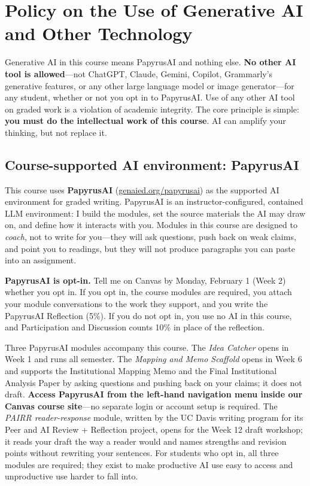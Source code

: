 \documentclass[12pt]{article}
\begin{document}
\section*{Policy on the Use of Generative AI and Other Technology}

Generative AI in this course means PapyrusAI and nothing else. \textbf{No other AI tool is allowed}---not ChatGPT, Claude, Gemini, Copilot, Grammarly's generative features, or any other large language model or image generator---for any student, whether or not you opt in to PapyrusAI. Use of any other AI tool on graded work is a violation of academic integrity. The core principle is simple: \textbf{you must do the intellectual work of this course}. AI can amplify your thinking, but not replace it.

\subsection*{Course-supported AI environment: PapyrusAI}

This course uses \textbf{PapyrusAI} (\href{https://www.genaied.org/papyrusai.html}{genaied.org/papyrusai}) as the supported AI environment for graded writing. PapyrusAI is an instructor-configured, contained LLM environment: I build the modules, set the source materials the AI may draw on, and define how it interacts with you. Modules in this course are designed to \emph{coach}, not to write for you---they will ask questions, push back on weak claims, and point you to readings, but they will not produce paragraphs you can paste into an assignment.

\textbf{PapyrusAI is opt-in.} Tell me on Canvas by Monday, February 1 (Week 2) whether you opt in. If you opt in, the course modules are required, you attach your module conversations to the work they support, and you write the PapyrusAI Reflection (5\%). If you do not opt in, you use no AI in this course, and Participation and Discussion counts 10\% in place of the reflection.

Three PapyrusAI modules accompany this course. The \emph{Idea Catcher} opens in Week 1 and runs all semester. The \emph{Mapping and Memo Scaffold} opens in Week 6 and supports the Institutional Mapping Memo and the Final Institutional Analysis Paper by asking questions and pushing back on your claims; it does not draft. \textbf{Access PapyrusAI from the left-hand navigation menu inside our Canvas course site}---no separate login or account setup is required. The \emph{PAIRR reader-response} module, written by the UC Davis writing program for its Peer and AI Review + Reflection project, opens for the Week 12 draft workshop; it reads your draft the way a reader would and names strengths and revision points without rewriting your sentences. For students who opt in, all three modules are required; they exist to make productive AI use easy to access and unproductive use harder to fall into.
\end{document}
